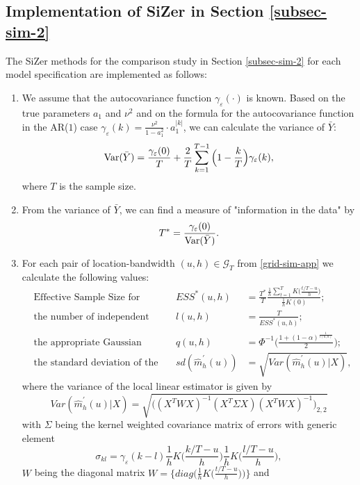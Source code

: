 \newpage
\subsection*{Implementation of SiZer in Section \ref{subsec-sim-2}}


The SiZer methods for the comparison study in Section \ref{subsec-sim-2} for each model specification are implemented as follows:
\begin{enumerate}
	\item We assume that the autocovariance function $\gamma_{\varepsilon}(\cdot)$ is known. Based on the true parameters $a_1$ and $\nu^2$ and on the formula for the autocovariance function in the AR($1$) case $\gamma_\varepsilon(k) = \frac{\nu^2 }{1 - a_1^2}\cdot a_1^{|k|}$, we can calculate the variance of $\bar{Y}$:
$$\textnormal{Var}(\bar{Y}) = \frac{\gamma_\varepsilon(0)}{T} + \frac{2}{T} \sum_{k = 1}^{T-1} \Big(1 - \frac{k}{T}\Big)\gamma_\varepsilon(k),$$
where $T$ is the sample size.
	\item From the variance of $\bar{Y}$, we can find a measure of "information in the data" by $$T^* = \frac{\gamma_\varepsilon(0)}{\textnormal{Var}(\bar{Y})}.$$
	\item For each pair of location-bandwidth $(u,h) \in \mathcal{G}_T$ from \eqref{grid-sim-app} we calculate the following values:
	\begin{align*}
	&\text{Effective Sample Size for dependent data:} &ESS^*(u, h) &= \frac{T^*}{T} \frac{\frac{1}{h}\sum_{t =1}^T K\big(\frac{t/T - u}{h}\big)}{\frac{1}{h}K(0)};\\
	&\text{the number of independent blocks:} &l(u, h) &= \frac{T}{ESS^*(u, h)};\\
	&\text{the appropriate Gaussian quantile:} &q(u, h) &= \Phi^{-1} \Big(\frac{1 + (1 - \alpha)^{\frac{1}{l(u, h)}}}{2}\Big);\\
	&\text{the standard deviation of the estimator:} &sd(\widehat{m}^\prime_h(u)) &= \sqrt{Var(\widehat{m}^\prime_h(u)|X)},
	\end{align*}
	where the variance of the local linear estimator is given by 
	$$ Var(\widehat{m}^\prime_h(u)|X)= \sqrt{\big((X^T W X)^{-1} (X^T \Sigma X) (X^T W X)^{-1}\big)_{2, 2}}$$ 
	with $\Sigma$ being the kernel weighted covariance matrix of errors with generic element $$\sigma_{kl} = \gamma_\varepsilon(k - l) \frac{1}{h} K\Big(\frac{k/T - u}{h}\Big) \frac{1}{h}  K\Big(\frac{l/T - u}{h}\Big),$$
	$W$ being the diagonal matrix $W = \Big\{diag\big(\frac{1}{h} K\big(\frac{t/T - u}{h}\big)\big)\Big\}$ and 
			\begin{equation}

\end{equation}
\end{enumerate}
